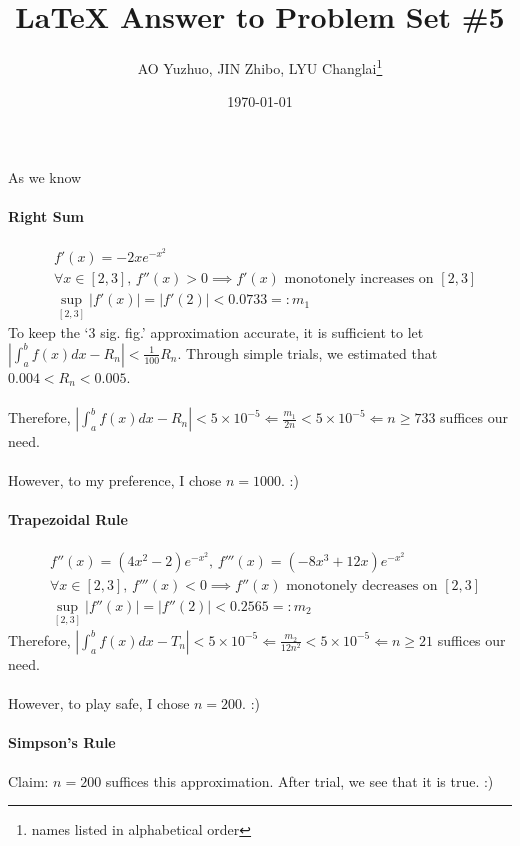 \documentclass{article}
\title{\LaTeX{} Answer to Problem Set \#5}
\author{AO Yuzhuo, JIN Zhibo, LYU Changlai\thanks{names listed in alphabetical order}}
\date{\today}
\begin{document}
\maketitle

\section{}
As we know
\paragraph{Right Sum}
$$\begin{aligned}
    &f'(x) = -2xe^{-x^2} \\
    &\forall x \in [2,3] ,\, f''(x)>0 \implies f'(x) \text{ monotonely increases on } [2,3] \\
    &\sup_{[2,3]} \left|f'(x)\right| = \left|f'(2)\right| < 0.0733 =: m_1
\end{aligned}$$
To keep the ‘3 sig. fig.’ approximation accurate, it is sufficient to let $\left| \int_a^b f(x)dx - R_n \right| < \frac{1}{100}R_n$.
Through simple trials, we estimated that $0.004<R_n<0.005$.
\\\\
Therefore, $\left| \int_a^b f(x)dx - R_n \right| < 5\times 10^{-5} \Longleftarrow \frac{m_1}{2n} < 5\times 10^{-5} \Longleftarrow n \ge 733$ suffices our need.
\\\\
However, to my preference, I chose $n=1000$. :)

\paragraph{Trapezoidal Rule}
$$\begin{aligned}
    &f''(x) = (4x^2-2)e^{-x^2} ,\, f'''(x) = (-8x^3+12x)e^{-x^2} \\
    &\forall x \in [2,3] ,\, f'''(x)<0 \implies f''(x) \text{ monotonely decreases on } [2,3] \\
    &\sup_{[2,3]} \left|f''(x)\right| = \left|f''(2)\right| < 0.2565 =: m_2
\end{aligned}$$
Therefore, $\left| \int_a^b f(x)dx - T_n \right| < 5\times 10^{-5} \Longleftarrow \frac{m_2}{12n^2} < 5\times 10^{-5} \Longleftarrow n \ge 21$ suffices our need.
\\\\
However, to play safe, I chose $n=200$. :)

\paragraph{Simpson's Rule}
Claim: $n=200$ suffices this approximation. After trial, we see that it is true. :)
\end{document}
